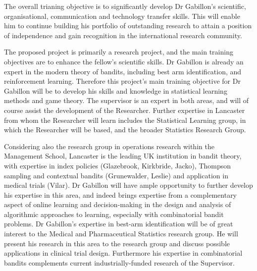 \documentclass[a4paper,11pt]{article}
\begin{document}
The overall trianing objective is to significantly develop Dr Gabillon's scientific, organisational, communication and technology transfer skills.  This will enable him to continue building his portfolio of outstanding research to attain a position of independence and gain recognition in the international research community.

The proposed project is primarily a research project, and the main training objectives are to enhance the fellow's scientific skills. Dr Gabillon is already an expert in the modern theory of bandits, including best arm identification, and reinforcement learning.  Therefore this project's main training objective for Dr Gabillon will be to develop his skills and knowledge in statistical learning methods and game theory.  The supervisor is an expert in both areas, and will of course assist the development of the Researcher.  Further expertise in Lancaster from whom the Researcher will learn includes the Statistical Learning group, in which the Researcher will be based, and the broader Statistics Research Group.

Considering also the research group in operations research within the Management School, Lancaster is the leading UK institution in bandit theory, with expertise in index policies (Glazebrook, Kirkbride, Jacko), Thompson sampling and contextual bandits (Grunewalder, Leslie) and application in medical trials (Vilar). Dr Gabillon will have ample opportunity to further develop his expertise in this area, and indeed brings expertise from a complementary aspect of online learning and decision-making in the design and analysis of algorithmic approaches to learning, especially with combinatorial bandit problems.   Dr Gabillon's expertise in best-arm identification will be of great interest to the Medical and Pharmaceutical Statistics research group.  He will present his research in this area to the research group and discuss possible applications in clinical trial design.  Furthermore his expertise in combinatorial bandits complements current industrially-funded research of the Supervisor.
\end{document}
